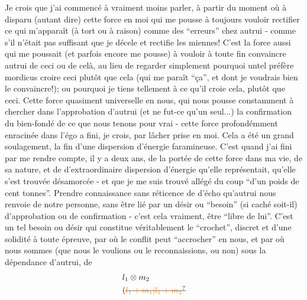 Je crois que j'ai commencé à vraiment moins parler, à partir du moment où à disparu (autant dire) cette force en moi qui me pousse à toujours vouloir rectifier ce qui m'apparaît (à tort ou à raison) comme des ``erreurs'' chez autrui - comme s'il n'était pas suffisant que je décele et rectifie les miennes! C'est la force aussi qui me poussait (et parfois encore me pousse) à vouloir à toute fin convaincre autrui de ceci ou de celà, au lieu de regarder simplement pourquoi untel préfère mordicus croire ceci plutôt que cela (qui me paraît ``ça'', et dont je voudrais bien le convaincre!); ou pourquoi je tiens tellement à ce qu'il croie cela, plutôt que ceci. Cette force quasiment universelle en nous, qui nous pousse constamment à chercher dans l'approbation d'autrui (et ne fut-ce qu'un seul...) la confirmation du bien-fondé de ce que nous tenons pour vrai - cette force profondémment enracinée dans l'égo a fini, je crois, par lâcher prise en moi. Cela a été un grand soulagement, la fin d'une dispersion d'énergie faramineuse. C'est quand j'ai fini par me rendre compte, il y a deux ans, de la portée de cette force dans ma vie, de sa nature, et de d'extraordinaire dispersion d'énergie qu'elle représentait, qu'elle s'est trouvée désamorcée - et que je me suis trouvé allégé du coup ``d'un poids de cent tonnes''. Prendre connaissance sans réticence de d'écho qu'autrui nous renvoie de notre personne, sans être lié par un désir ou ``besoin'' (si caché soit-il) d'approbation ou de confirmation - c'est cela vraiment, être ``libre de lui''. C'est un tel besoin ou désir qui constitue véritablement le ``crochet'', discret et d'une solidité à toute épreuve, par où le conflit peut ``accrocher'' en nous, et par où nous sommes (que nous le voulions ou le reconnaissions, ou non) sous la dépendance d'autrui, de
\[
\begin{aligned}
&l_1\otimes m_2\\
&(\deleted{\unsure{l_1+m_1|l_1+m_2}}
\end{aligned}
\]
